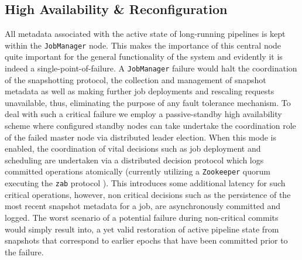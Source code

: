 
\subsection{High Availability \& Reconfiguration}

All metadata associated with the active state of long-running pipelines is kept within the \texttt{JobManager} node. This makes the importance of this central node quite important for the general functionality of the system and evidently it is indeed a single-point-of-failure. A \texttt{JobManager} failure would halt the coordination of the snapshotting protocol, the collection and management of snapshot metadata as well as making further job deployments and rescaling requests unavailable, thus, eliminating the purpose of any fault tolerance mechanism. To deal with such a critical failure we employ a passive-standby high availability scheme where configured standby nodes can take undertake the coordination role of the failed master node via distributed leader election. When this mode is enabled, the coordination of vital decisions such as job deployment and scheduling are undertaken via a distributed decision protocol which logs committed operations atomically (currently utilizing a \texttt{Zookeeper} quorum executing the \texttt{zab} protocol \cite{hunt2010zookeeper}). This introduces some additional latency for such critical operations, however, non critical decisions such as the persistence of the most recent snapshot metadata for a job, are asynchronously committed and logged. The worst scenario of a potential failure during non-critical commits would simply result into, a yet valid restoration of active pipeline state from snapshots that correspond to earlier epochs that have been committed prior to the failure.

	